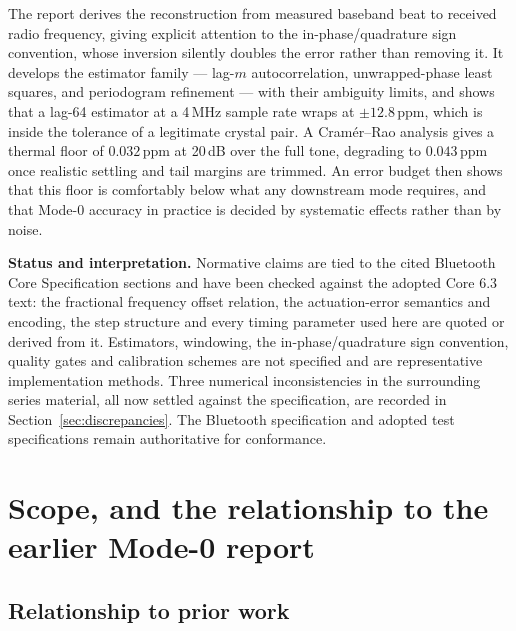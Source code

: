 \documentclass[11pt,a4paper]{article}
\begin{document}
The report derives the reconstruction from measured baseband beat to received radio frequency, giving
explicit attention to the in-phase/quadrature sign convention, whose inversion silently doubles the
error rather than removing it. It develops the estimator family --- lag-$m$ autocorrelation,
unwrapped-phase least squares, and periodogram refinement --- with their ambiguity limits, and shows
that a lag-64 estimator at a 4\,MHz sample rate wraps at $\pm12.8$\,ppm, which is inside the tolerance
of a legitimate crystal pair. A Cram\'er--Rao analysis gives a thermal floor of $0.032$\,ppm at
20\,dB over the full tone, degrading to $0.043$\,ppm once realistic settling and tail margins are
trimmed. An error budget then shows that this floor is comfortably below what any downstream mode
requires, and that Mode-0 accuracy in practice is decided by systematic effects rather than by noise.

\begin{callout}
\textbf{Status and interpretation.} Normative claims are tied to the cited Bluetooth Core
Specification sections and have been checked against the adopted Core 6.3 text: the fractional
frequency offset relation, the actuation-error semantics and encoding, the step structure and every
timing parameter used here are quoted or derived from it. Estimators, windowing, the
in-phase/quadrature sign convention, quality gates and calibration schemes are not specified and are
representative implementation methods. Three numerical inconsistencies in the surrounding series
material, all now settled against the specification, are recorded in
Section~\ref{sec:discrepancies}. The Bluetooth specification and adopted test specifications remain
authoritative for conformance.
\end{callout}

\newpage
\tableofcontents
\newpage
{}
\setcounter{page}{1}

\section{Scope, and the relationship to the earlier Mode-0 report}
\label{sec:relationship}

\subsection{Relationship to prior work}
\end{document}
